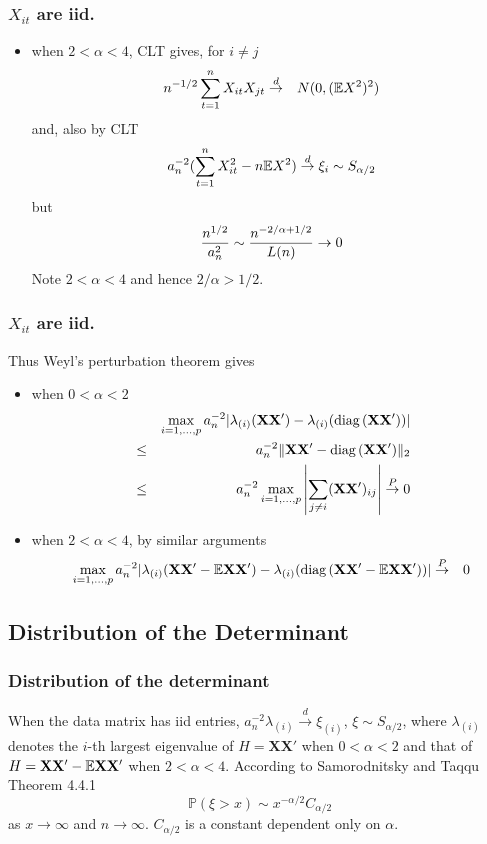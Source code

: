 \documentclass{beamer}
\renewcommand{\P}{
\mathbb P
}
\begin{document}
\begin{frame}
  \frametitle{$X_{it}$ are iid.}
  \begin{itemize}
  \item when $2 < \alpha < 4$, CLT gives, for $i \neq j$
    \begin{eqnarray*}
      n^{-1/2} \sum_{t=1}^n X_{it}X_{jt} &\overset{d}{\to}& N(0, (\mathbb{E} X^2)^2)
    \end{eqnarray*}
    and, also by CLT
    \[
    a_n^{-2}(\sum_{t=1}^n X_{it}^2 - n \mathbb{E} X^2) \overset{d}{\to} \xi_i
    \sim S_{\alpha/2}
    \]
    but
    \[
    {n^{1/2} \over a_n^2} \sim {n^{-2/\alpha + 1/2} \over L(n)} \to 0
    \]
    Note $2 < \alpha < 4$ and hence $2/\alpha > 1/2$.
  \end{itemize}
\end{frame}

\begin{frame}
  \frametitle{$X_{it}$ are iid.}
  Thus Weyl's perturbation theorem gives
  \begin{itemize}
  \item when $0 < \alpha < 2$
    \begin{eqnarray*}
    && \max_{i=1,\dots,p} a_n^{-2} |\lambda_{(i)}(\mathbf{XX'}) - \lambda_{(i)}(\text{diag\,}(\mathbf{XX'}))| \\
    &\leq& a_n^{-2} \|\mathbf{XX'} - \text{diag\,}(\mathbf{XX'})\|_2 \\
    &\leq& a_n^{-2} \max_{i=1,\dots,p} \left|\sum_{j\neq i} (\mathbf{XX'})_{ij}\right|
    \overset{P}{\to} 0
    \end{eqnarray*}
  \item when $2 < \alpha < 4$, by similar arguments
    \begin{eqnarray*}
      \max_{i=1,\dots,p} a_n^{-2} |\lambda_{(i)}(\mathbf{XX'} - \mathbb{E} \mathbf{XX'}) -
      \lambda_{(i)}(\text{diag\,}(\mathbf{XX'} - \mathbb{E} \mathbf{XX'}))|
      &\overset{P}{\to}& 0
    \end{eqnarray*}
  \end{itemize}
\end{frame}

\subsection{Distribution of the Determinant}
\begin{frame}
\frametitle{Distribution of the determinant}
When the data matrix has iid entries, $a_n^{-2} \lambda_{(i)} \overset{d}{\to}
\xi_{(i)}$, $\xi \sim S_{\alpha/2}$, where $\lambda_{(i)}$ denotes
the $i$-th largest eigenvalue of $H = \mathbf{XX'}$ when $0 < \alpha < 2$ and that
of $H = \mathbf{XX'} - \mathbb{E} \mathbf{XX'}$ when $2 < \alpha < 4$. According to Samorodnitsky and
Taqqu\cite{SamorodnitskyTaqqu1994} Theorem 4.4.1
$$
\P(\xi > x) \sim x^{-\alpha/2} C_{\alpha/2}
$$
as $x \to \infty$ and $n \to \infty$. $C_{\alpha/2}$ is a constant
dependent only on $\alpha$.
\end{frame}
\end{document}
